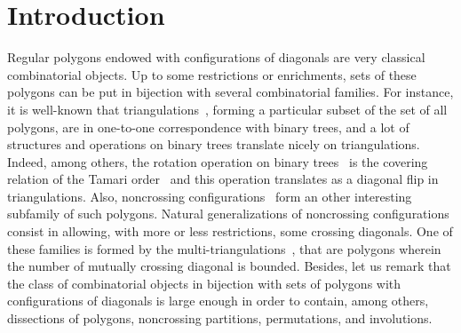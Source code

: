 \documentclass[10pt,reqno]{amsart}
\numberwithin{equation}{subsection}
\begin{document}
\section*{Introduction}
Regular polygons endowed with configurations of diagonals are very
classical combinatorial objects. Up to some restrictions or enrichments,
sets of these polygons can be put in bijection with several
combinatorial families. For instance, it is well-known that
triangulations~\cite{DRS10}, forming a particular subset of the set
of all polygons, are in one-to-one correspondence with binary trees,
and a lot of structures and operations on binary trees translate nicely
on triangulations. Indeed, among others, the rotation operation on
binary trees~\cite{Knu98} is the covering relation of the Tamari
order~\cite{HT72} and this operation translates as a diagonal flip in
triangulations. Also, noncrossing configurations~\cite{FN99} form an
other interesting subfamily of such polygons. Natural generalizations of
noncrossing configurations consist in allowing, with more or less
restrictions, some crossing diagonals. One of these families is formed
by the multi-triangulations~\cite{CP92}, that are polygons wherein the
number of mutually crossing diagonal is bounded. Besides, let us remark
that the class of combinatorial objects in bijection with sets of
polygons with configurations of diagonals is large enough in order to
contain, among others, dissections of polygons, noncrossing partitions,
permutations, and involutions.
\smallskip
\end{document}
